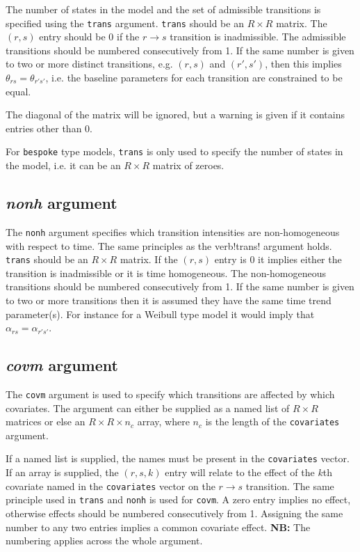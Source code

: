 \documentclass{article}
\numberwithin{equation}{section}
\begin{document}
The number of states in the model and the set of admissible transitions is specified using the \verb!trans! argument. \verb!trans! should be an $R \times R$ matrix. The $(r,s)$ entry should be 0 if the $r \rightarrow s$ transition is inadmissible. The admissible transitions should be numbered consecutively from 1. If the same number is given to two or more distinct transitions, e.g. $(r,s)$ and $(r',s')$, then this implies $\theta_{rs} = \theta_{r's'}$, i.e. the baseline parameters for each transition are constrained to be equal.

The diagonal of the matrix will be ignored, but a warning is given if it contains entries other than 0.

For \verb!bespoke! type models, \verb!trans! is only used to specify the number of states in the model, i.e. it can be an $R \times R$ matrix of zeroes.

\subsection{{\it nonh} argument}

The \verb!nonh! argument specifies which transition intensities are non-homogeneous with respect to time. The same principles as the verb!trans! argument holds. \verb!trans! should be an $R \times R$ matrix. If the $(r,s)$ entry is 0 it implies either the transition is inadmissible or it is time homogeneous. The non-homogeneous transitions should be numbered consecutively from 1. If the same number is given to two or more transitions then it is assumed they have the same time trend parameter(s). For instance for a Weibull type model it would imply that $\alpha_{rs} = \alpha_{r's'}$.

\subsection{{\it covm} argument}

The \verb!covm! argument is used to specify which transitions are affected by which covariates. The argument can either be supplied as a named list of $R \times R$ matrices or else an $R \times R \times n_c$ array, where $n_c$ is the length of the \verb!covariates! argument. 

If a named list is supplied, the names must be present in the \verb!covariates! vector. If an array is supplied, the $(r,s, k)$ entry will relate to the effect of the $k$th covariate named in the \verb!covariates! vector on the $r \rightarrow s$ transition. The same principle used in \verb!trans! and \verb!nonh! is used for \verb!covm!. A zero entry implies no effect, otherwise effects should be numbered consecutively from 1. Assigning the same number to any two entries implies a common covariate effect. {\bf NB:} The numbering applies across the whole argument.
\end{document}
